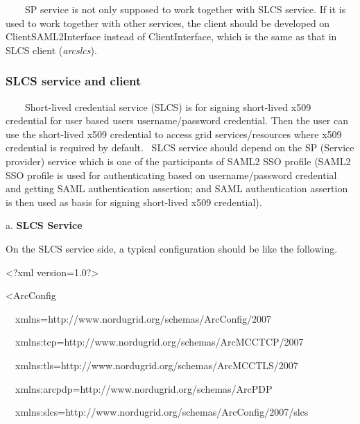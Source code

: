 \documentclass{article}
\begin{document}
{\color{black}
\ \ \ \ SP service is not only supposed to work together with SLCS
service. If it is used to work together with other services, the client
should be developed on ClientSAML2Interface instead of ClientInterface,
which is the same as that in SLCS client (\textit{arcslcs}).}


\bigskip

\subsubsection{SLCS service and client}
{\color{black}
\ \ \ \ Short-lived credential service (SLCS) is for signing short-lived
x509 credential for user based user{\textquotesingle}s
username/password credential. Then the user can use the short-lived
x509 credential to access grid services/resources where x509 credential
is required by default. \ SLCS service should depend on the SP (Service
provider) service which is one of the participants of SAML2 SSO profile
(SAML2 SSO profile is used for authenticating based on
username/password credential and getting SAML authentication assertion;
and SAML authentication assertion is then used as basis for signing
short-lived x509 credential).}

{\color{black}
a. \textbf{SLCS Service} }

{\color{black}
On the SLCS service side, a typical configuration should be like the
following.}

{\ttfamily\color{black}
{\textless}?xml version={\textquotedbl}1.0{\textquotedbl}?{\textgreater}
}

{\ttfamily\color{black}
{\textless}ArcConfig }

{\ttfamily\color{black}
\ \ xmlns={\textquotedbl}http://www.nordugrid.org/schemas/ArcConfig/2007{\textquotedbl}
}

{\ttfamily\color{black}
\ \ xmlns:tcp={\textquotedbl}http://www.nordugrid.org/schemas/ArcMCCTCP/2007{\textquotedbl}
}

{\ttfamily\color{black}
\ \ xmlns:tls={\textquotedbl}http://www.nordugrid.org/schemas/ArcMCCTLS/2007{\textquotedbl}
}

{\ttfamily\color{black}
\ \ xmlns:arcpdp={\textquotedbl}http://www.nordugrid.org/schemas/ArcPDP{\textquotedbl}
}

{\ttfamily\color{black}
\ \ xmlns:slcs={\textquotedbl}http://www.nordugrid.org/schemas/ArcConfig/2007/slcs{\textquotedbl}
}
\end{document}
